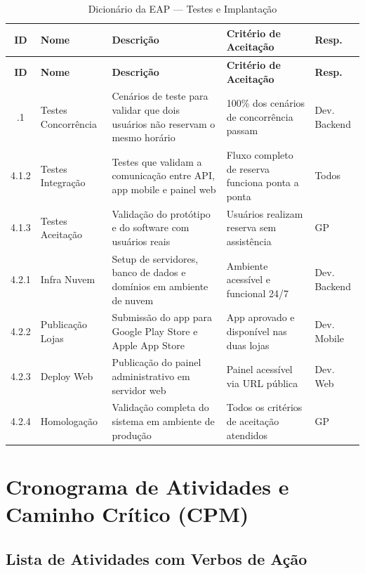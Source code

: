 \documentclass[12pt,a4paper,oneside]{report}
\begin{document}
\begin{longtable}{c p{2.5cm} p{3.2cm} p{3.5cm} p{2cm}}
\caption{Dicionário da EAP --- Testes e Implantação} \\
\toprule
\textbf{ID} & \textbf{Nome} & \textbf{Descrição} & \textbf{Critério de Aceitação} & \textbf{Resp.} \\
\midrule
\endfirsthead
\toprule
\textbf{ID} & \textbf{Nome} & \textbf{Descrição} & \textbf{Critério de Aceitação} & \textbf{Resp.} \\
\midrule
\endhead
\bottomrule
\endlastfoot
4.1.1 & Testes Concorrência & Cenários de teste para validar que dois usuários não reservam o mesmo horário & 100\% dos cenários de concorrência passam & Dev. Backend \\
4.1.2 & Testes Integração & Testes que validam a comunicação entre API, app mobile e painel web & Fluxo completo de reserva funciona ponta a ponta & Todos \\
4.1.3 & Testes Aceitação & Validação do protótipo e do software com usuários reais & Usuários realizam reserva sem assistência & GP \\
4.2.1 & Infra Nuvem & Setup de servidores, banco de dados e domínios em ambiente de nuvem & Ambiente acessível e funcional 24/7 & Dev. Backend \\
4.2.2 & Publicação Lojas & Submissão do app para Google Play Store e Apple App Store & App aprovado e disponível nas duas lojas & Dev. Mobile \\
4.2.3 & Deploy Web & Publicação do painel administrativo em servidor web & Painel acessível via URL pública & Dev. Web \\
4.2.4 & Homologação & Validação completa do sistema em ambiente de produção & Todos os critérios de aceitação atendidos & GP \\
\end{longtable}

\chapter{Cronograma de Atividades e Caminho Crítico (CPM)}

\section{Lista de Atividades com Verbos de Ação}
\end{document}

